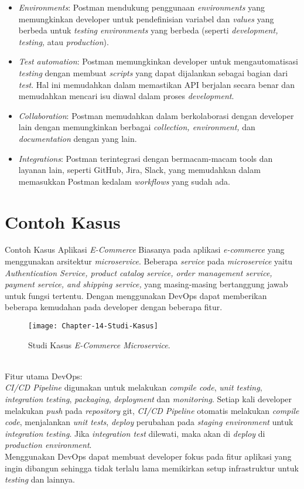 \begin{enumerate}
\begin{itemize}
		\item \textit{Environments}: Postman mendukung penggunaan \textit{environments} yang memungkinkan developer untuk pendefinisian variabel dan \textit{values} yang berbeda untuk \textit{testing environments} yang berbeda (seperti \textit{development, testing,} atau \textit{production}).
		
		\item \textit{Test automation}: Postman memungkinkan developer untuk mengautomatisasi \textit{testing} dengan membuat \textit{scripts} yang dapat dijalankan sebagai bagian dari \textit{test}. Hal ini memudahkan dalam memastikan API berjalan secara benar dan memudahkan mencari isu diawal dalam proses \textit{development}.
		
		\item \textit{Collaboration}: Postman memudahkan dalam berkolaborasi dengan developer lain dengan memungkinkan berbagai \textit{collection, environment,} dan \textit{documentation} dengan yang lain.
		
		\item \textit{Integrations}: Postman terintegrasi dengan bermacam-macam tools dan layanan lain, seperti GitHub, Jira, Slack, yang memudahkan dalam memasukkan Postman kedalam \textit{workflows} yang sudah ada.
	\end{itemize}
\end{enumerate}
\section{Contoh Kasus}
Contoh Kasus Aplikasi \textit{E-Commerce}
Biasanya pada aplikasi \textit{e-commerce} yang menggunakan arsitektur \textit{microservice}. Beberapa \textit{service} pada \textit{microservice} yaitu
\textit{Authentication Service, product catalog service, order management service, payment service, and shipping service,} yang masing-masing bertanggung jawab untuk fungsi tertentu.
Dengan menggunakan DevOps dapat memberikan beberapa kemudahan pada developer dengan beberapa fitur.
\begin{figure}[h]
	\centering
	\texttt{[image: Chapter-14-Studi-Kasus]}
	\caption{Studi Kasus \textit{E-Commerce Microservice}.}
	\label{fig:client-server-schema}
\end{figure}
\\Fitur utama DevOps:
	\\\textit{CI/CD Pipeline} digunakan untuk melakukan \textit{compile code}, \textit{unit testing}, \textit{integration testing}, \textit{packaging}, \textit{deployment} dan \textit{monitoring}.
	Setiap kali developer melakukan \textit{push} pada \textit{repository} git, \textit{CI/CD Pipeline} otomatis melakukan \textit{compile code}, menjalankan \textit{unit tests},
	\textit{deploy} perubahan pada \textit{staging environment} untuk \textit{integration testing}. Jika \textit{integration test} dilewati, maka akan di \textit{deploy} di \textit{production environment}.
	\\Menggunakan DevOps dapat membuat developer fokus pada fitur aplikasi yang ingin dibangun sehingga tidak terlalu lama memikirkan setup infrastruktur untuk \textit{testing} dan lainnya.
